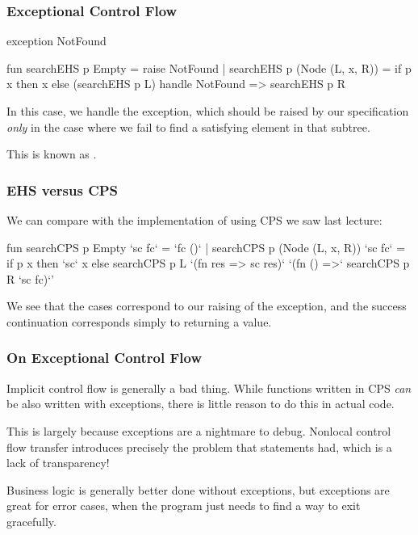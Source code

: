 \documentclass[aspectratio=169]{beamer}
\begin{document}
\begin{frame}[fragile]
  \frametitle{Exceptional Control Flow}
  \begin{codeblock}
    exception NotFound 
    
    fun searchEHS p Empty = raise NotFound 
      | searchEHS p (Node (L, x, R)) = 
          if p x then
            x
          else
            (searchEHS p L) handle NotFound => searchEHS p R 
  \end{codeblock}

  \pause
  \vspace{\fill}

  In this case, we handle the  exception, which should be raised
  by our specification \textit{only} in the case where we fail to find a 
  satisfying element in that subtree.

  \pause
  \vspace{\fill}

  This is known as .
\end{frame}

\begin{frame}[fragile]
  \frametitle{EHS versus CPS}

  We can compare with the implementation of  using CPS we saw last lecture:

  \vspace{\fill}

  \begin{codeblock}
    fun searchCPS p Empty `sc fc` = `fc ()`
      | searchCPS p (Node (L, x, R)) `sc fc` =
          if p x then
            `sc` x 
          else
            searchCPS p L 
              `(fn res => sc res)`
              `(fn () =>` searchCPS p R `sc fc)`'
  \end{codeblock}

  \pause
  \vspace{\fill}

  We see that the  cases correspond to our raising of the  exception,
  and the success continuation corresponds simply to returning a value.

\end{frame}

\begin{frame}[fragile]
  \frametitle{On Exceptional Control Flow}

  Implicit control flow is generally a bad thing. While functions written in
  CPS \textit{can} be also written with exceptions, there is little reason to
  do this in actual code.

  \pause
  \vspace{\fill}

  This is largely because exceptions are a nightmare to debug. Nonlocal control
  flow transfer introduces precisely the problem that  statements 
  had, which is a lack of transparency!

  \pause
  \vspace{\fill}

  Business logic is generally better done without exceptions, but exceptions are
  great for error cases, when the program just needs to find a way to exit
  gracefully.
\end{frame}
\end{document}
